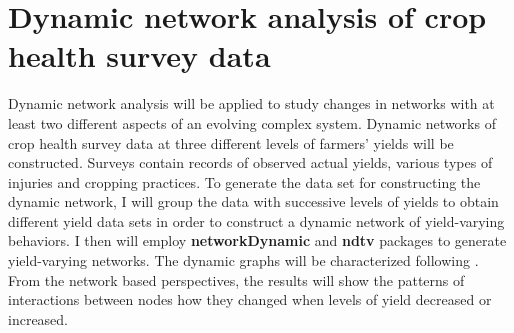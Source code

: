 \section*{Dynamic network analysis of crop health survey data}

Dynamic network analysis will be applied to study changes in networks with at least two different aspects of an evolving complex system. Dynamic networks of crop health survey data at three different levels of farmers' yields will be constructed. Surveys contain records of observed actual yields, various types of injuries and cropping practices. To generate the data set for constructing the dynamic network, I will group the data with successive levels of yields to obtain different yield data sets in order to construct a dynamic network of yield-varying behaviors. I then will employ \textbf{networkDynamic} \citep{networkdynamicpackage} and \textbf{ndtv} \citep{ndtvpackage} packages to generate yield-varying networks. The dynamic graphs will be characterized following \citep{bilgin2006dynamic, kolaczyk2014statistical}. From the network based perspectives, the results will show the patterns of interactions between nodes how they changed when levels of yield decreased or increased.

